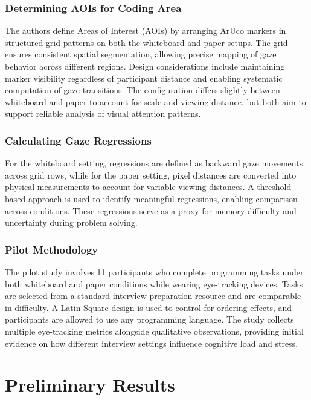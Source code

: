 \subsubsection{Determining AOIs for Coding Area}
The authors define Areas of Interest (AOIs) by arranging ArUco markers in structured grid patterns on both the whiteboard and paper setups. The grid ensures consistent spatial segmentation, allowing precise mapping of gaze behavior across different regions. Design considerations include maintaining marker visibility regardless of participant distance and enabling systematic computation of gaze transitions. The configuration differs slightly between whiteboard and paper to account for scale and viewing distance, but both aim to support reliable analysis of visual attention patterns.

\subsubsection{Calculating Gaze Regressions}
For the whiteboard setting, regressions are defined as backward gaze movements across grid rows, while for the paper setting, pixel distances are converted into physical measurements to account for variable viewing distances. A threshold-based approach is used to identify meaningful regressions, enabling comparison across conditions. These regressions serve as a proxy for memory difficulty and uncertainty during problem solving.

\subsubsection{Pilot Methodology}
The pilot study involves 11 participants who complete programming tasks under both whiteboard and paper conditions while wearing eye-tracking devices. Tasks are selected from a standard interview preparation resource and are comparable in difficulty. A Latin Square design is used to control for ordering effects, and participants are allowed to use any programming language. The study collects multiple eye-tracking metrics alongside qualitative observations, providing initial evidence on how different interview settings influence cognitive load and stress.

\section{Preliminary Results}
